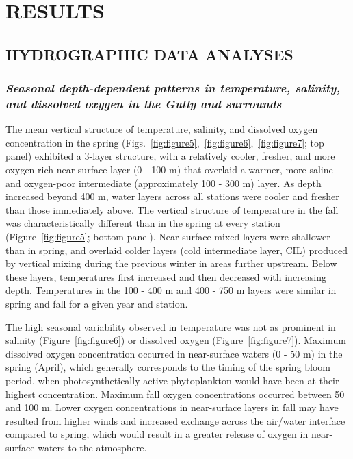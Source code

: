 \documentclass[12pt]{article}\usepackage[]{graphicx}\usepackage[]{color}
\begin{document}
\clearpage

\hypertarget{sec:results}{%
\section{RESULTS}\label{sec:results}}

\hypertarget{sec:hydrographic-analyses}{%
\subsection{\texorpdfstring{\textbf{HYDROGRAPHIC DATA ANALYSES}}{HYDROGRAPHIC DATA ANALYSES}}\label{sec:hydrographic-analyses}}

\hypertarget{seasonal-depth-dependent-patterns-in-temperature-salinity-and-dissolved-oxygen-in-the-gully-and-surrounds}{%
\subsubsection{\texorpdfstring{\emph{Seasonal depth-dependent patterns in temperature, salinity, and dissolved oxygen in the Gully and surrounds}}{Seasonal depth-dependent patterns in temperature, salinity, and dissolved oxygen in the Gully and surrounds}}\label{seasonal-depth-dependent-patterns-in-temperature-salinity-and-dissolved-oxygen-in-the-gully-and-surrounds}}

The mean vertical structure of temperature, salinity, and dissolved oxygen concentration in the spring (Figs.~\ref{fig:figure5},~\ref{fig:figure6},~\ref{fig:figure7}; top panel) exhibited a 3-layer structure, with a relatively cooler, fresher, and more oxygen-rich near-surface layer (0 - 100 m) that overlaid a warmer, more saline and oxygen-poor intermediate (approximately 100 - 300 m) layer. As depth increased beyond 400 m, water layers across all stations were cooler and fresher than those immediately above. The vertical structure of temperature in the fall was characteristically different than in the spring at every station (Figure~\ref{fig:figure5}; bottom panel). Near-surface mixed layers were shallower than in spring, and overlaid colder layers (cold intermediate layer, CIL) produced by vertical mixing during the previous winter in areas further upstream. Below these layers, temperatures first increased and then decreased with increasing depth. Temperatures in the 100 - 400 m and 400 - 750 m layers were similar in spring and fall for a given year and station.

The high seasonal variability observed in temperature was not as prominent in salinity (Figure~\ref{fig:figure6}) or dissolved oxygen (Figure~\ref{fig:figure7}). Maximum dissolved oxygen concentration occurred in near-surface waters (0 - 50 m) in the spring (April), which generally corresponds to the timing of the spring bloom period, when photosynthetically-active phytoplankton would have been at their highest concentration. Maximum fall oxygen concentrations occurred between 50 and 100 m. Lower oxygen concentrations in near-surface layers in fall may have resulted from higher winds and increased exchange across the air/water interface compared to spring, which would result in a greater release of oxygen in near-surface waters to the atmosphere.
\end{document}
